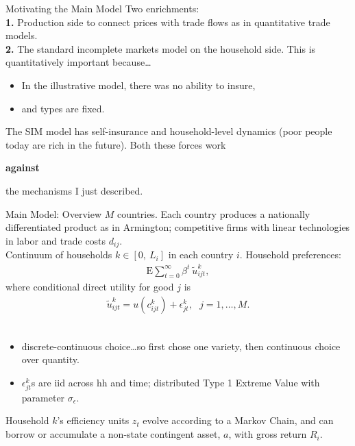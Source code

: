 \documentclass[9pt,pdftex,aspectratio=1610]{beamer}
\theoremstyle{definition}
\begin{document}
\begin{frame}[t]{Motivating the Main Model}
\smallskip
Two enrichments:\\
\medskip
\textbf{1.} Production side to connect prices with trade flows as in quantitative trade models.\\
\bigskip
\textbf{2.} The standard incomplete markets model on the household side. This is quantitatively important because\ldots
\begin{itemize}
\smallskip
\item In the illustrative model, there was no ability to insure,
\smallskip
\item and types are fixed.
\end{itemize}
\medskip
The SIM model has self-insurance and household-level dynamics (poor people today are rich in the future). Both these forces work \begin{alert}{\textbf{against}}\end{alert} the mechanisms I just described.
\end{frame}


\begin{frame}[t]{Main Model: Overview}
$M$ countries. Each country produces a nationally differentiated product as in Armington; competitive firms with linear technologies in labor and trade costs $d_{ij}$.\\
\bigskip
Continuum of households $k \in [0, \ L_i]$ in each country $i$. Household preferences:
\begin{align*}
\mathrm{E}\sum_{t = 0}^{\infty} \beta^{t} \ \tilde{u}^k_{ijt},
\end{align*}
where conditional direct utility for good $j$ is
\begin{align*}
\tilde{u}^k_{ijt} =  u(c^k_{ijt}) + \epsilon^k_{jt}, \ \ \ j = 1, \ldots, M.
\end{align*}\\
\begin{itemize}
\item  discrete-continuous choice\ldots so first chose one variety, then continuous choice over quantity.
\smallskip
\item $\epsilon^k_{jt}$s are iid across hh and time; distributed Type 1 Extreme Value with parameter $\sigma_{\epsilon}$.
\end{itemize}
\bigskip
Household $k$'s efficiency units $z_t$ evolve according to a Markov Chain, and can borrow or accumulate a non-state contingent asset, $a$, with gross return $R_{i}$.
\end{frame}
\end{document}
